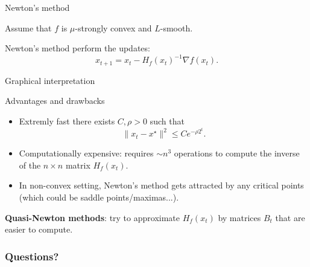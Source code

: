 \documentclass{beamer}
\begin{document}
\begin{frame}[t]{Newton's method}
	\grid

	\vspace{-0.2cm}
	Assume that $f$ is $\mu$-strongly convex and $L$-smooth.
		\vspace{-0.3cm}
	\begin{exampleblock}{}
		Newton's method perform the updates:
		$$
		x_{t+1} = x_t - H_f(x_t)^{-1} \nabla f(x_t).
		$$
	\end{exampleblock}
\end{frame}

\begin{frame}[t]{Graphical interpretation}
	\grid


\end{frame}

\begin{frame}[t]{Advantages and drawbacks}
	\grid

			\vspace{-0.2cm}
	\begin{itemize}
		\item Extremly fast there exists $C,\rho > 0$ such that
			$$
			\|x_t - x^{\star} \|^{2} \leq C e^{- \rho 2^t}.
			$$
		\item Computationally expensive: requires $\sim n^3$ operations to compute the inverse of the $n \times n$ matrix $H_f(x_t)$.
			\vspace{0.2cm}
		\item In non-convex setting, Newton's method gets attracted by any critical points (which could be saddle points/maximas...).
	\end{itemize}

			\vspace{0.5cm}
	\textbf{Quasi-Newton methods}: try to approximate $H_f(x_t)$ by matrices $B_t$ that are easier to compute.

\end{frame}


\appendix
\backupbegin
\begin{frame}[t]
	\frametitle{Questions?}
	\grid

	\pause
\end{frame}
\backupend
\end{document}
